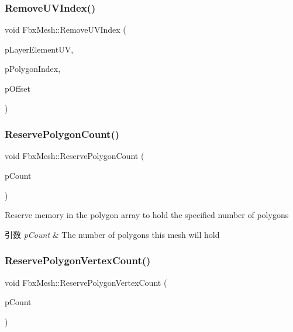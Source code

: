 \subsubsection{\texorpdfstring{Remove\+U\+V\+Index()}{RemoveUVIndex()}}
{\footnotesize\ttfamily void Fbx\+Mesh\+::\+Remove\+U\+V\+Index (\begin{DoxyParamCaption}\item[{\hyperlink{class_fbx_layer_element_u_v}{Fbx\+Layer\+Element\+UV} $\ast$}]{p\+Layer\+Element\+UV,  }\item[{int}]{p\+Polygon\+Index,  }\item[{int}]{p\+Offset }\end{DoxyParamCaption})\hspace{0.3cm}{\ttfamily [protected]}}

\mbox{\label{class_fbx_mesh_ab7d47000aac6c7de0a6fe0ccaff248cd}} 
\subsubsection{\texorpdfstring{Reserve\+Polygon\+Count()}{ReservePolygonCount()}}
{\footnotesize\ttfamily void Fbx\+Mesh\+::\+Reserve\+Polygon\+Count (\begin{DoxyParamCaption}\item[{int}]{p\+Count }\end{DoxyParamCaption})}

Reserve memory in the polygon array to hold the specified number of polygons 
\begin{DoxyParams}{引数}
{\em p\+Count} & The number of polygons this mesh will hold \\
\hline
\end{DoxyParams}
\mbox{\label{class_fbx_mesh_a6cb8ace34a7b945a249a73f5293075e4}} 
\subsubsection{\texorpdfstring{Reserve\+Polygon\+Vertex\+Count()}{ReservePolygonVertexCount()}}
{\footnotesize\ttfamily void Fbx\+Mesh\+::\+Reserve\+Polygon\+Vertex\+Count (\begin{DoxyParamCaption}\item[{int}]{p\+Count }\end{DoxyParamCaption})}

